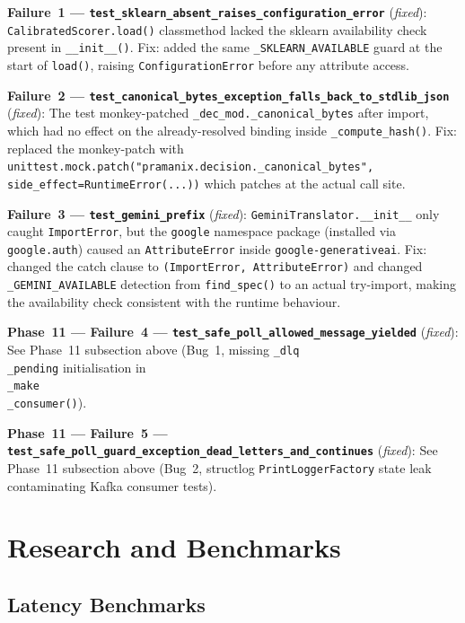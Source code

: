 \documentclass[12pt,a4paper,oneside]{report}
\newcommand{\code}[1]{\texttt{#1}}           %
\begin{document}
\textbf{Failure~1 ---
\code{test\_sklearn\_absent\_raises\_configuration\_error}} (\textit{fixed}):
\code{CalibratedScorer.load()} classmethod lacked the sklearn availability
check present in \code{\_\_init\_\_()}.  Fix: added the same
\code{\_SKLEARN\_AVAILABLE} guard at the start of \code{load()}, raising
\code{ConfigurationError} before any attribute access.

\textbf{Failure~2 ---
\code{test\_canonical\_bytes\_exception\_falls\_back\_to\_stdlib\_json}}
(\textit{fixed}): The test monkey-patched \code{\_dec\_mod.\_canonical\_bytes}
after import, which had no effect on the already-resolved binding inside
\code{\_compute\_hash()}.  Fix: replaced the monkey-patch with
\code{unittest.mock.patch("pramanix.decision.\_canonical\_bytes",
side\_effect=RuntimeError(...))} which patches at the actual call site.

\textbf{Failure~3 --- \code{test\_gemini\_prefix}} (\textit{fixed}):
\code{GeminiTranslator.\_\_init\_\_} only caught \code{ImportError}, but the
\code{google} namespace package (installed via \code{google.auth}) caused an
\code{AttributeError} inside \code{google-generativeai}.  Fix: changed the
catch clause to \code{(ImportError, AttributeError)} and changed
\code{\_GEMINI\_AVAILABLE} detection from \code{find\_spec()} to an actual
try-import, making the availability check consistent with the runtime
behaviour.

\textbf{Phase~11 --- Failure~4 ---
\code{test\_safe\_poll\_allowed\_message\_yielded}} (\textit{fixed}):
See Phase~11 subsection above (Bug~1, missing \code{\_dlq\\_pending}
initialisation in \code{\\_make\\_consumer()}).

\textbf{Phase~11 --- Failure~5 ---
\code{test\_safe\_poll\_guard\_exception\_dead\_letters\_and\_continues}}
(\textit{fixed}): See Phase~11 subsection above (Bug~2, structlog
\code{PrintLoggerFactory} state leak contaminating Kafka consumer tests).

\chapter{Research and Benchmarks}

\section{Latency Benchmarks}
\end{document}
